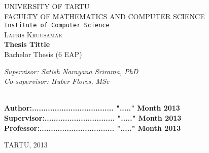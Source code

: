 \begin{titlepage}

\begin{center}



\textsc{UNIVERSITY OF TARTU}\\

\textsc{FACULTY OF MATHEMATICS AND COMPUTER SCIENCE}\\

\texttt{Institute of Computer Science}\\[6cm]

\textsc{ \large Lauris Kruusamäe}\\[0.5cm]
{\Huge \bfseries Thesis Tittle}\\[0.5cm]
{\large Bachelor Thesis (6 EAP)}\\[3cm]



\begin{minipage}{0.8\textwidth}
\begin{flushright} \large
\emph{Supervisor: Satish Narayana Srirama, PhD}  \\	  %
\emph{Co-supervisor: Huber Flores, MSc}  %
\end{flushright}
\end{minipage}

\textbf{}\\[1.0cm]

\textbf{Author:.................................... "....." Month   2013}\\[0.5cm]

\textbf{Supervisor:............................... "....." Month   2013}\\[0.5cm]

\textbf{Professor:................................. "....." Month   2013}\\[0.5cm]        

\vfill

{\large TARTU, 2013}

\end{center}

\end{titlepage}
